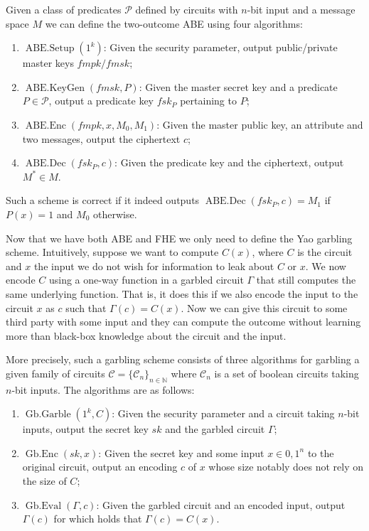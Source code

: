\documentclass[11pt, a4paper]{article}
\newcommand{\op}[1]{\operatorname{#1}}
\begin{document}
Given a class of predicates $\mathcal{P}$ defined by circuits with $n$-bit input and a message space $M$ we can define the two-outcome ABE using four algorithms:
\begin{enumerate}
    \item $\op{ABE.Setup}(1^k)$: Given the security parameter, output public/private master keys $fmpk/fmsk$;
    \item $\op{ABE.KeyGen}(fmsk, P)$: Given the master secret key and a predicate $P \in \mathcal{P}$, output a predicate key $fsk_P$ pertaining to $P$;
    \item $\op{ABE.Enc}(fmpk, x, M_0, M_1)$: Given the master public key, an attribute and two messages, output the ciphertext $c$;
    \item $\op{ABE.Dec}(fsk_P, c)$: Given the predicate key and the ciphertext, output $M^* \in M$.
\end{enumerate}
Such a scheme is correct if it indeed outputs $\op{ABE.Dec}(fsk_P, c) = M_1$ if $P(x) = 1$ and $M_0$ otherwise.

Now that we have both ABE and FHE we only need to define the Yao garbling scheme.
Intuitively, suppose we want to compute $C(x)$, where $C$ is the circuit and $x$ the input we do not wish for information to leak about $C$ or $x$.
We now encode $C$ using a one-way function in a garbled circuit $\Gamma$ that still computes the same underlying function.
That is, it does this if we also encode the input to the circuit $x$ as $c$ such that $\Gamma(c) = C(x)$.
Now we can give this circuit to some third party with some input and they can compute the outcome without learning more than black-box knowledge about the circuit and the input.

More precisely, such a garbling scheme consists of three algorithms for garbling a given family of circuits $\mathcal{C} = \{\mathcal{C}_n\}_{n\in\mathbb{N}}$ where $\mathcal{C}_n$ is a set of boolean circuits taking $n$-bit inputs. The algorithms are as follows:
\begin{enumerate}
    \item $\op{Gb.Garble}(1^k, C)$: Given the security parameter and a circuit taking $n$-bit inputs, output the secret key $sk$ and the garbled circuit $\Gamma$;
    \item $\op{Gb.Enc}(sk, x)$: Given the secret key and some input $x \in {0,1}^n$ to the original circuit, output an encoding $c$ of $x$ whose size notably does not rely on the size of $C$;
    \item $\op{Gb.Eval}(\Gamma, c)$: Given the garbled circuit and an encoded input, output $\Gamma(c)$ for which holds that $\Gamma(c) = C(x)$.
\end{enumerate}
\end{document}
